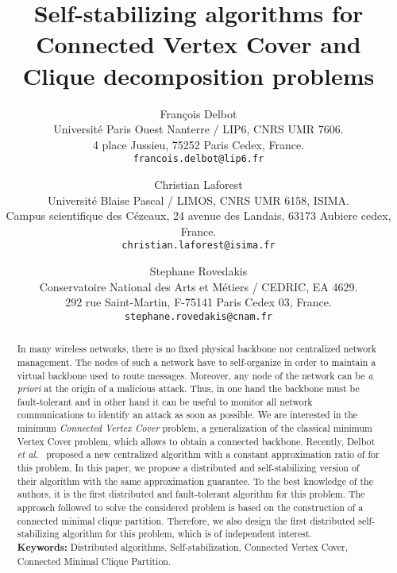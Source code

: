 \documentclass[11pt,letterpaper,onecolumn]{article}
\begin{document}
\title{Self-stabilizing algorithms for Connected Vertex Cover and Clique decomposition problems}

\author{Fran\c{c}ois Delbot\\
Universit\'{e} Paris Ouest Nanterre / LIP6, CNRS UMR 7606.\\4 place Jussieu, 75252 Paris Cedex, France.\\ \texttt{francois.delbot@lip6.fr}\\
\and Christian Laforest\\
Universit\'{e} Blaise Pascal / LIMOS, CNRS UMR 6158, ISIMA.\\Campus scientifique des C\'{e}zeaux, 24 avenue des Landais, 63173 Aubiere cedex, France.\\ \texttt{christian.laforest@isima.fr}\\
\and Stephane Rovedakis\\
Conservatoire National des Arts et M\'{e}tiers / CEDRIC, EA 4629.\\292 rue Saint-Martin, F-75141 Paris Cedex 03, France.\\ \texttt{stephane.rovedakis@cnam.fr}
}


\maketitle


\begin{abstract}
In many wireless networks, there is no fixed physical backbone nor centralized network management. The nodes of such a network have to self-organize in order to maintain a virtual backbone used to route messages. Moreover, any node of the network can be \textit{a priori} at the origin of a malicious attack. Thus, in one hand the backbone must be fault-tolerant and in other hand it can be useful to monitor all network communications to identify an attack as soon as possible. We are interested in the minimum \emph{Connected Vertex Cover} problem, a generalization of the classical minimum Vertex Cover problem, which allows to obtain a connected backbone. Recently, Delbot \emph{et al.}~\cite{DelbotLP13} proposed a new centralized algorithm with a constant approximation ratio of  for this problem. In this paper, we propose a distributed and self-stabilizing version of their algorithm with the same approximation guarantee. To the best knowledge of the authors, it is the first distributed and fault-tolerant algorithm for this problem. The approach followed to solve the considered problem is based on the construction of a connected minimal clique partition. Therefore, we also design the first distributed self-stabilizing algorithm for this problem, which is of independent interest.\\

\textbf{Keywords:} Distributed algorithms, Self-stabilization, Connected Vertex Cover, Connected Minimal Clique Partition.
\end{abstract}
\end{document}
